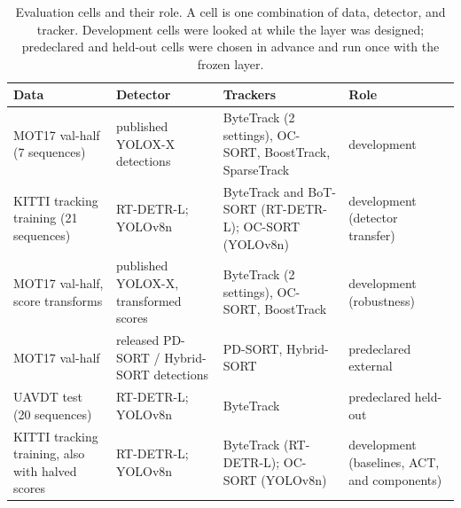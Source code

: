 \begin{table}[!tp]
\caption{Evaluation cells and their role. A cell is one combination of data,
detector, and tracker. Development cells were looked at while the layer was
designed; predeclared and held-out cells were chosen in advance and run once
with the frozen layer.}
\label{tab:data}
\centering\footnotesize
\setlength{\tabcolsep}{4pt}
\begin{tabular}{@{}>{\raggedright\arraybackslash}p{29mm}>{\raggedright\arraybackslash}p{25mm}>{\raggedright\arraybackslash}p{42mm}>{\raggedright\arraybackslash}p{25mm}@{}}
\toprule
Data & Detector & Trackers & Role\\
\midrule
MOT17 val-half (7 sequences) & published YOLOX-X detections & ByteTrack (2 settings), OC-SORT, BoostTrack, SparseTrack & development\\
KITTI tracking training (21 sequences) & RT-DETR-L; YOLOv8n & ByteTrack and BoT-SORT (RT-DETR-L); OC-SORT (YOLOv8n) & development (detector transfer)\\
MOT17 val-half, score transforms & published YOLOX-X, transformed scores & ByteTrack (2 settings), OC-SORT, BoostTrack & development (robustness)\\
MOT17 val-half & released PD-SORT / Hybrid-SORT detections & PD-SORT, Hybrid-SORT & predeclared external\\
UAVDT test (20 sequences) & RT-DETR-L; YOLOv8n & ByteTrack & predeclared held-out\\
KITTI tracking training, also with halved scores & RT-DETR-L; YOLOv8n & ByteTrack (RT-DETR-L); OC-SORT (YOLOv8n) & development (baselines, ACT, and components)\\
\bottomrule
\end{tabular}
\end{table}
